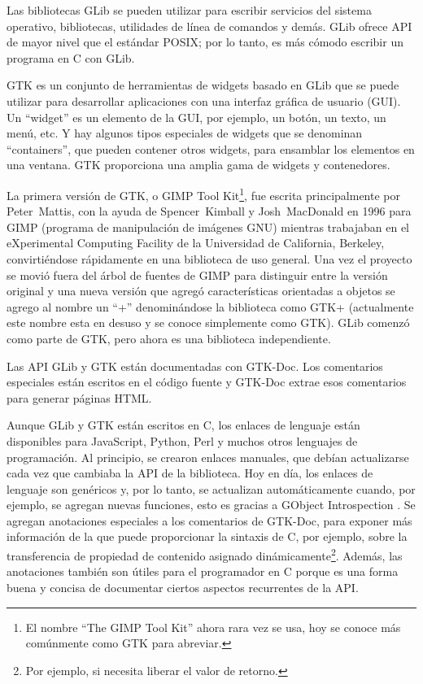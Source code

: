 Las bibliotecas GLib se pueden utilizar para escribir servicios del sistema operativo, bibliotecas, utilidades de línea de comandos y demás. GLib ofrece API de mayor nivel que el estándar POSIX; por lo tanto, es más cómodo escribir un programa en C con GLib.

GTK es un conjunto de herramientas de widgets basado en GLib que se puede utilizar para desarrollar aplicaciones con una interfaz gráfica de usuario (GUI). Un ``widget'' es un elemento de la GUI, por ejemplo, un botón, un texto, un menú, etc. Y hay algunos tipos especiales de widgets que se denominan ``containers'', que pueden contener otros widgets, para ensamblar los elementos en una ventana. GTK proporciona una amplia gama de widgets y contenedores.

La primera versión de GTK, o GIMP Tool Kit\footnote{El nombre ``The GIMP Tool Kit'' ahora rara vez se usa, hoy se conoce más comúnmente como GTK para abreviar.}, fue escrita principalmente por Peter~Mattis, con la ayuda de Spencer~Kimball y Josh~MacDonald en 1996 para GIMP (programa de manipulación de imágenes GNU) mientras trabajaban en el eXperimental Computing Facility de la Universidad de California, Berkeley, convirtiéndose rápidamente en una biblioteca de uso general. Una vez el proyecto se movió fuera del árbol de fuentes de GIMP para distinguir entre la versión original y una nueva versión que agregó características orientadas a objetos se agrego al nombre un ``+'' denominándose la biblioteca como GTK+ (actualmente este nombre esta en desuso y se conoce simplemente como GTK). GLib comenzó como parte de GTK, pero ahora es una biblioteca independiente.

Las API GLib y GTK están documentadas con GTK-Doc. Los comentarios especiales están escritos en el código fuente y GTK-Doc extrae esos comentarios para generar páginas HTML.

Aunque GLib y GTK están escritos en C, los enlaces de lenguaje están disponibles para JavaScript, Python, Perl y muchos otros lenguajes de programación. Al principio, se crearon enlaces manuales, que debían actualizarse cada vez que cambiaba la API de la biblioteca. Hoy en día, los enlaces de lenguaje son genéricos y, por lo tanto, se actualizan automáticamente cuando, por ejemplo, se agregan nuevas funciones, esto es gracias a GObject Introspection . Se agregan anotaciones especiales a los comentarios de GTK-Doc, para exponer más información de la que puede proporcionar la sintaxis de C, por ejemplo, sobre la transferencia de propiedad de contenido asignado dinámicamente\footnote{Por ejemplo, si necesita liberar el valor de retorno.}. Además, las anotaciones también son útiles para el programador en C porque es una forma buena y concisa de documentar ciertos aspectos recurrentes de la API.

